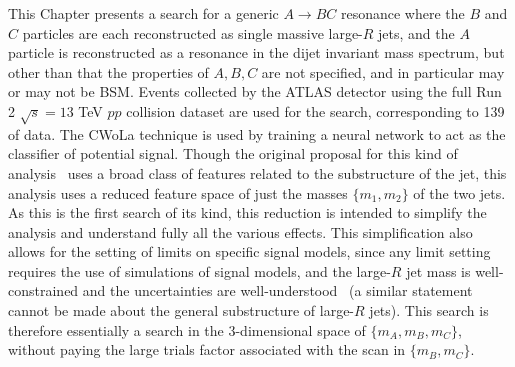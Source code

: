This Chapter presents a search for a generic $A\rightarrow BC$ resonance where the $B$ and $C$ particles are each reconstructed as single massive large-$R$ jets, and the $A$ particle is reconstructed as a resonance in the dijet invariant mass spectrum, but other than that the properties of $A,B,C$ are not specified, and in particular may or may not be BSM.
Events collected by the ATLAS detector using the full Run 2 $\sqrt{s}=13$ TeV $pp$ collision dataset are used for the search, corresponding to 139\ifb{} of data.
The CWoLa technique is used by training a neural network to act as the classifier of potential signal.
Though the original proposal for this kind of analysis~\cite{Collins:2019jip} uses a broad class of features related to the substructure of the jet, this analysis uses a reduced feature space of just the masses $\{m_1,m_2\}$ of the two jets.
As this is the first search of its kind, this reduction is intended to simplify the analysis and understand fully all the various effects.
This simplification also allows for the setting of limits on specific signal models, since any limit setting requires the use of simulations of signal models, and the large-$R$ jet mass is well-constrained and the uncertainties are well-understood~\cite{Aaboud:2018kfi} (a similar statement cannot be made about the general substructure of large-$R$ jets).
This search is therefore essentially a search in the 3-dimensional space of $\{m_A,m_B,m_C\}$, without paying the large trials factor associated with the scan in $\{m_B,m_C\}$.

